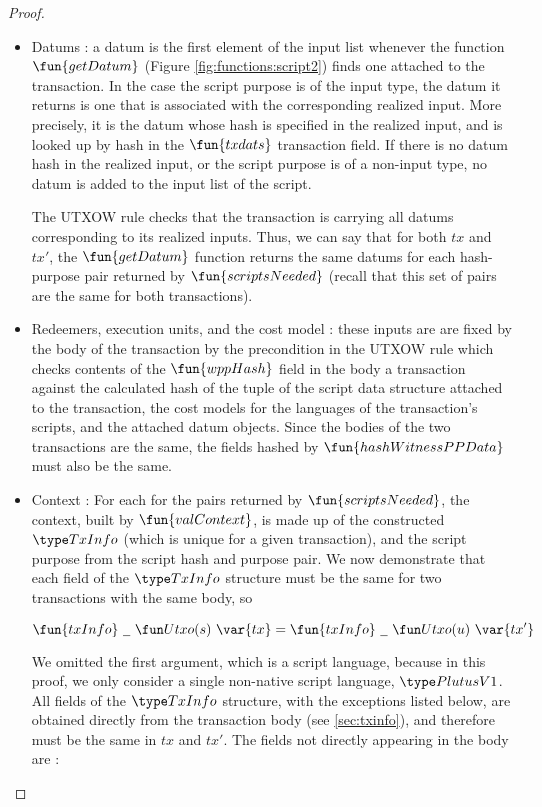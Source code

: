 \begin{property}
\begin{proof}
\begin{itemize}
    \begin{itemize}
      \item Datums : a datum is the first element of the input list whenever
      the function $\fun{getDatum}$ (Figure \ref{fig:functions:script2})
      finds one attached to the transaction. In the case the script purpose
      is of the input type, the datum it returns is one that
      is associated with the corresponding realized input. More precisely, it is the datum whose
      hash is specified in the realized input, and is looked up by hash in the $\fun{txdats}$
      transaction field. If there is no datum hash in the realized input, or the script purpose
      is of a non-input type, no datum is added to the input list of the script.

      The UTXOW rule checks that the transaction is carrying all datums corresponding
      to its realized inputs. Thus, we can say that for both $tx$ and $tx'$, the
      $\fun{getDatum}$ function returns the same datums for each hash-purpose
      pair returned by $\fun{scriptsNeeded}$ (recall that this set of pairs
      are the same for both transactions).

      \item Redeemers, execution units, and the cost model : these inputs are are fixed by the body of the transaction
      by the precondition in the UTXOW rule
      which checks contents of the $\fun{wppHash}$ field in the body a transaction against the calculated hash
      of the tuple of the script data structure attached to the transaction, the cost models for the
      languages of the transaction's scripts, and the attached datum objects. Since the bodies of
      the two transactions are the same, the fields hashed by $\fun{hashWitnessPPData}$ must also be the same.

      \item Context : For each for the pairs returned by $\fun{scriptsNeeded}$,
      the context, built by $\fun{valContext}$, is made up of the constructed $\TxInfo$ (which is unique for
      a given transaction), and the script purpose from the script hash and purpose pair.
      We now demonstrate that each field of the $\TxInfo$ structure must be
      the same for two transactions with the same body, so

      \[ \fun{txInfo}~\wcard~\Utxo(s)~\var{tx} = \fun{txInfo}~\wcard~\Utxo(u)~\var{tx'}\]

      We omitted the first argument, which is a script language, because in this proof, we only consider
      a single non-native script language, $\PlutusVI$. All fields of the $\TxInfo$
      structure, with the exceptions listed below,
      are obtained directly from the transaction body (see \ref{sec:txinfo}),
      and therefore must be the same in $tx$ and $tx'$. The fields not directly
      appearing in the body are :


\end{itemize}
\end{itemize}
\end{proof}
\end{property}
